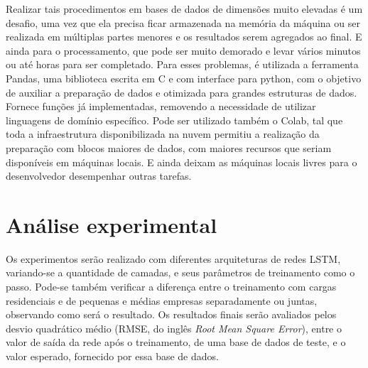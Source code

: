 \documentclass[
	12pt,				%
	oneside,			%
	a4paper,			%
	english,			%
	brazil				%
	]{abntex2}
\begin{document}
	Realizar tais procedimentos em bases de dados de dimensões muito elevadas é um desafio, uma vez que ela precisa ficar armazenada na memória da máquina ou ser realizada em múltiplas partes menores e os resultados serem agregados ao final. E ainda para o processamento, que pode ser muito demorado e levar vários minutos ou até horas para ser completado. Para esses problemas, é utilizada a ferramenta Pandas, uma biblioteca escrita em C e com interface para python, com o objetivo de auxiliar a preparação de dados e otimizada para grandes estruturas de dados. Fornece funções já implementadas, removendo a necessidade de utilizar linguagens de domínio específico. Pode ser utilizado também o Colab, tal que toda a infraestrutura disponibilizada na nuvem permitiu a realização da preparação com blocos maiores de dados, com maiores recursos que seriam disponíveis em máquinas locais. E ainda deixam as máquinas locais livres para o desenvolvedor desempenhar outras tarefas. 
	
	



\chapter{Análise experimental}

	Os experimentos serão realizado com diferentes arquiteturas de redes LSTM, variando-se a quantidade de camadas, e seus parâmetros de treinamento como o passo. Pode-se também verificar a diferença entre o treinamento com cargas residenciais e de pequenas e médias empresas separadamente ou juntas, observando como será o resultado. Os resultados finais serão avaliados pelos desvio quadrático médio (RMSE, do inglês \textit{Root Mean Square Error}), entre o valor de saída da rede após o treinamento, de uma base de dados de teste, e o valor esperado, fornecido por essa base de dados. 
	
\end{document}
